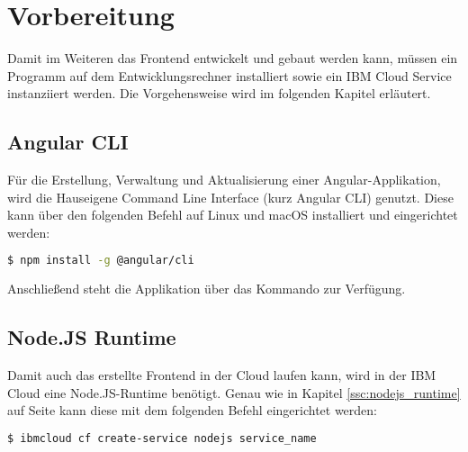 \section{Vorbereitung}
Damit im Weiteren das Frontend entwickelt und gebaut werden kann, müssen ein Programm auf dem Entwicklungsrechner
installiert sowie ein IBM Cloud Service instanziiert werden. Die Vorgehensweise wird im folgenden Kapitel erläutert.

\subsection{Angular CLI}
Für die Erstellung, Verwaltung und Aktualisierung einer Angular-Applikation, wird die Hauseigene Command Line Interface
(kurz Angular CLI) genutzt. Diese kann über den folgenden Befehl auf Linux und macOS installiert und eingerichtet werden:

\begin{lstlisting}[language=bash, caption=Installation Angular CLI, label=Installation Angular CLI]
$ npm install -g @angular/cli
\end{lstlisting}

Anschließend steht die Applikation über das Kommando  zur Verfügung.

\subsection{Node.JS Runtime}
Damit auch das erstellte Frontend in der Cloud laufen kann, wird in der IBM Cloud eine Node.JS-Runtime benötigt. Genau
wie in Kapitel \ref{ssc:nodejs_runtime} auf Seite \pageref{ssc:nodejs_runtime} kann diese mit dem folgenden Befehl
eingerichtet werden:

\begin{lstlisting}[language=bash, caption=Instanziierung der Node.JS Runtime, label=Instanziierung der Node.JS Runtime]
$ ibmcloud cf create-service nodejs service_name
\end{lstlisting}